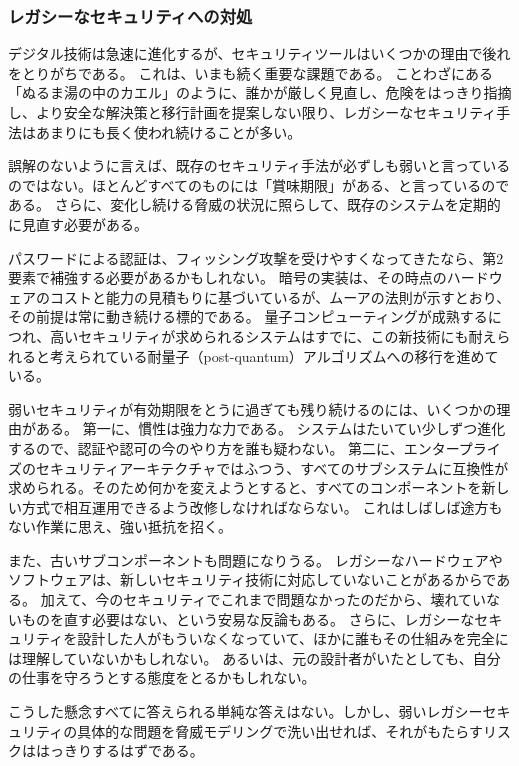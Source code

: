 \documentclass[uplatex]{jsarticle}
\def\label#1{}%
\begin{document}
\subsubsection{レガシーなセキュリティへの対処}

デジタル技術は急速に進化するが、セキュリティツールはいくつかの理由で後れをとりがちである。
これは、いまも続く重要な課題である。
ことわざにある「ぬるま湯の中のカエル」のように、誰かが厳しく見直し、危険をはっきり指摘し、より安全な解決策と移行計画を提案しない限り、レガシーなセキュリティ手法はあまりにも長く使われ続けることが多い。

誤解のないように言えば、既存のセキュリティ手法が必ずしも弱いと言っているのではない。ほとんどすべてのものには「賞味期限」がある、と言っているのである。
さらに、変化し続ける脅威の状況に照らして、既存のシステムを定期的に見直す必要がある。

\begin{exa}[セキュリティの賞味期限]\label{exa:ch13-sell-by-date}
パスワードによる認証は、フィッシング攻撃を受けやすくなってきたなら、第2要素で補強する必要があるかもしれない。
暗号の実装は、その時点のハードウェアのコストと能力の見積もりに基づいているが、ムーアの法則が示すとおり、その前提は常に動き続ける標的である。
量子コンピューティングが成熟するにつれ、高いセキュリティが求められるシステムはすでに、この新技術にも耐えられると考えられている耐量子（post-quantum）アルゴリズムへの移行を進めている。
\end{exa}

弱いセキュリティが有効期限をとうに過ぎても残り続けるのには、いくつかの理由がある。
第一に、慣性は強力な力である。
システムはたいてい少しずつ進化するので、認証や認可の今のやり方を誰も疑わない。
第二に、エンタープライズのセキュリティアーキテクチャではふつう、すべてのサブシステムに互換性が求められる。そのため何かを変えようとすると、すべてのコンポーネントを新しい方式で相互運用できるよう改修しなければならない。
これはしばしば途方もない作業に思え、強い抵抗を招く。

また、古いサブコンポーネントも問題になりうる。
レガシーなハードウェアやソフトウェアは、新しいセキュリティ技術に対応していないことがあるからである。
加えて、今のセキュリティでこれまで問題なかったのだから、壊れていないものを直す必要はない、という安易な反論もある。
さらに、レガシーなセキュリティを設計した人がもういなくなっていて、ほかに誰もその仕組みを完全には理解していないかもしれない。
あるいは、元の設計者がいたとしても、自分の仕事を守ろうとする態度をとるかもしれない。

こうした懸念すべてに答えられる単純な答えはない。しかし、弱いレガシーセキュリティの具体的な問題を脅威モデリングで洗い出せれば、それがもたらすリスクははっきりするはずである。
\end{document}
